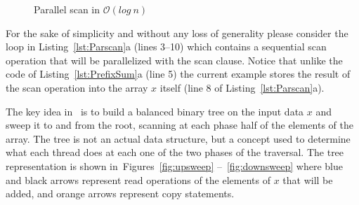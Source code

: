 \documentclass[Ingles]{ic-tese-v1}
\newcommand{\rfigs}[2]{Figures~\ref{fig:#1} --~\ref{fig:#2}}
\newcommand{\rlsts}[2]{Listing~\ref{lst:#1}{#2}}
\begin{document}
\begin{figure}[t]
	\centering
	\caption{Parallel scan in $\mathcal{O}(log\  n)$}
	\vfill
\end{figure}

For the sake  of simplicity and without any loss  of generality please
consider the loop  in \rlsts{Parscan}{a} (lines 3--10)  which contains a
sequential   scan  operation   that  will  be
parallelized  with the  scan clause.  Notice that  unlike the  code of
\rlsts{PrefixSum}{a} (line 5) the current  example stores the result of
the scan operation into the   array $x$ itself (line 8 of \rlsts{Parscan}{a}).

The key  idea in~\cite{Sengupta:2007} is  to build a  balanced binary
tree on the input data $x$ and  sweep it to and from the root, scanning
at each phase half  of the elements of the array.  The  tree is not an
actual  data structure,  but a  concept  used to  determine what  each
thread does at each one of the  two phases of the traversal.  The tree
representation is  shown in~\rfigs{upsweep}{downsweep} where  blue and
black arrows  represent read  operations of the  elements of  $x$ that
will be added, and orange arrows represent copy statements.
\end{document}
